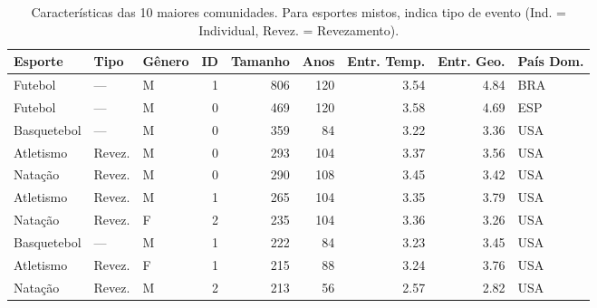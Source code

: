 \begin{table}[htbp]
\caption{Características das 10 maiores comunidades. Para esportes mistos, indica tipo de evento (Ind. = Individual, Revez. = Revezamento).}
\label{tab:top_communities}
\centering
\footnotesize
\begin{tabular}{lllrrrrrl}
\toprule
\textbf{Esporte} & \textbf{Tipo} & \textbf{Gênero} & \textbf{ID} & \textbf{Tamanho} & \textbf{Anos} & \textbf{Entr. Temp.} & \textbf{Entr. Geo.} & \textbf{País Dom.} \\
\midrule
Futebol & — & M & 1 & 806 & 120 & 3.54 & 4.84 & BRA \\
Futebol & — & M & 0 & 469 & 120 & 3.58 & 4.69 & ESP \\
Basquetebol & — & M & 0 & 359 & 84 & 3.22 & 3.36 & USA \\
Atletismo & Revez. & M & 0 & 293 & 104 & 3.37 & 3.56 & USA \\
Natação & Revez. & M & 0 & 290 & 108 & 3.45 & 3.42 & USA \\
Atletismo & Revez. & M & 1 & 265 & 104 & 3.35 & 3.79 & USA \\
Natação & Revez. & F & 2 & 235 & 104 & 3.36 & 3.26 & USA \\
Basquetebol & — & M & 1 & 222 & 84 & 3.23 & 3.45 & USA \\
Atletismo & Revez. & F & 1 & 215 & 88 & 3.24 & 3.76 & USA \\
Natação & Revez. & M & 2 & 213 & 56 & 2.57 & 2.82 & USA \\
\bottomrule
\end{tabular}
\end{table}
